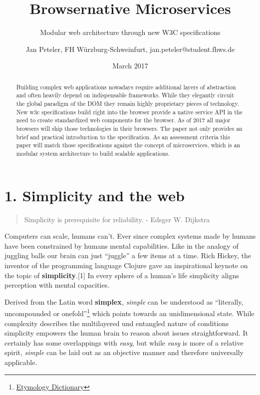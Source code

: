 \documentclass[]{article}
\title{Browsernative Microservices}
\subtitle{Modular web architecture through new W3C specifications}
\author{Jan Peteler, FH Würzburg-Schweinfurt, jan.peteler@student.fhws.de}
\date{March 2017}
\begin{document}
\maketitle
\begin{abstract}
Building complex web applications nowadays require additional layers of
abstraction and often heavily depend on indispensable frameworks. While
they elegantly circuit the global paradigm of the DOM they remain highly
proprietary pieces of technology. New w3c specifications build right
into the browser provide a native service API in the need to create
standardized web components for the browser. As of 2017 all major
browsers will ship those technologies in their browsers. The paper not
only provides an brief and practical introduction to the specification.
As an assessment criteria this paper will match those specifications
against the concept of microservices, which is an modular system
architecture to build scalable applications.
\end{abstract}

{
\setcounter{tocdepth}{3}
\tableofcontents
}
\section{1. Simplicity and the web}\label{simplicity-and-the-web}

\begin{quote}
Simplicity is prerequisite for reliability. - Edsger W. Dijkstra
\end{quote}

Computers can scale, humans can't. Ever since complex systems made by
humans have been constrained by humans mental capabilities. Like in the
analogy of juggling balls our brain can just ``juggle'' a few items at a
time. Rich Hickey, the inventor of the programming language Clojure gave
an inspirational keynote on the topic of \textbf{simplicity}.{[}1{]} In
every sphere of a human's life simplicity aligns perception with mental
capacities.

Derived from the Latin word \textbf{simplex}, \emph{simple} can be
understood as ``literally, uncompounded or onefold''\footnote{\href{http://www.etymonline.com/index.php?term=simple}{Etymology
  Dictionary}} which points towards an unidimensional state. While
complexity describes the multilayered und entangled nature of conditions
simplicity empowers the human brain to reason about issues
straightforward. It certainly has some overlappings with \emph{easy},
but while \emph{easy} is more of a relative spirit, \emph{simple} can be
laid out as an objective manner and therefore universally applicable.
\end{document}
